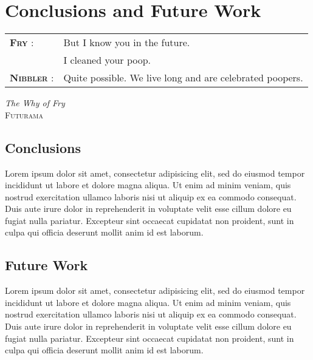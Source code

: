 \chapter{Conclusions and Future Work} %
\label{cha:conclusions}

\setlength{\epigraphwidth}{8cm}
\renewcommand{\tabcolsep}{0em}

\epigraph{
  \begin{tabular}{p{1.75cm}p{6cm}}
    \footnotesize{\textbf{\textsc{Fry}} :}
      & But I know you in the future.\\
      & I cleaned your poop. \\
    \footnotesize{\textbf{\textsc{Nibbler}} :}
      & Quite possible. We live long and are celebrated poopers. \\
  \end{tabular}
  \vspace{1em}
}{\textit{The Why of Fry}\\ \textsc{Futurama}}

\newpage

\section{Conclusions} %
\label{sec:conclusions}

Lorem ipsum dolor sit amet, consectetur adipisicing elit, sed do eiusmod tempor incididunt ut labore et dolore magna aliqua. Ut enim ad minim veniam, quis nostrud exercitation ullamco laboris nisi ut aliquip ex ea commodo consequat. Duis aute irure dolor in reprehenderit in voluptate velit esse cillum dolore eu fugiat nulla pariatur. Excepteur sint occaecat cupidatat non proident, sunt in culpa qui officia deserunt mollit anim id est laborum.

\nicesectionending


\section{Future Work} %
\label{sec:future}

Lorem ipsum dolor sit amet, consectetur adipisicing elit, sed do eiusmod tempor incididunt ut labore et dolore magna aliqua. Ut enim ad minim veniam, quis nostrud exercitation ullamco laboris nisi ut aliquip ex ea commodo consequat. Duis aute irure dolor in reprehenderit in voluptate velit esse cillum dolore eu fugiat nulla pariatur. Excepteur sint occaecat cupidatat non proident, sunt in culpa qui officia deserunt mollit anim id est laborum.

\nicesectionending


